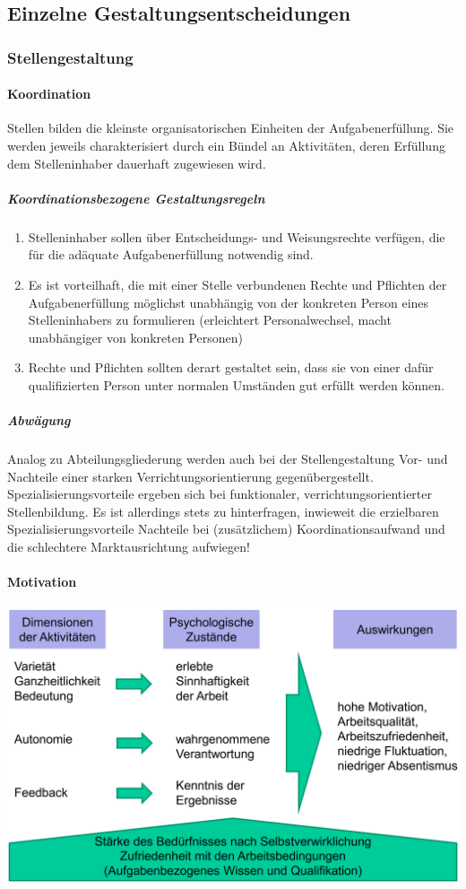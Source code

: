 \subsection{Einzelne Gestaltungsentscheidungen}
\subsubsection{Stellengestaltung}
\paragraph{Koordination}
Stellen bilden die kleinste organisatorischen Einheiten der Aufgabenerfüllung. Sie werden jeweils charakterisiert durch ein Bündel an Aktivitäten, deren Erfüllung dem Stelleninhaber dauerhaft zugewiesen wird.

\subparagraph{Koordinationsbezogene Gestaltungsregeln}
\begin{enumerate}
	\item Stelleninhaber sollen über Entscheidungs- und Weisungsrechte verfügen, die für die adäquate Aufgabenerfüllung notwendig sind.
	\item Es ist vorteilhaft, die mit einer Stelle verbundenen Rechte und Pflichten der Aufgabenerfüllung möglichst unabhängig von der konkreten Person eines Stelleninhabers zu formulieren (erleichtert Personalwechsel, macht unabhängiger von konkreten Personen)
	\item Rechte und Pflichten sollten derart gestaltet sein, dass sie von einer dafür qualifizierten Person unter normalen Umständen gut erfüllt werden können.
\end{enumerate}

\subparagraph{Abwägung}
Analog zu Abteilungsgliederung werden auch bei der Stellengestaltung Vor- und Nachteile einer starken Verrichtungsorientierung gegenübergestellt. Spezialisierungsvorteile ergeben sich bei funktionaler, verrichtungsorientierter Stellenbildung. Es ist allerdings stets zu hinterfragen, inwieweit die erzielbaren Spezialisierungsvorteile Nachteile bei (zusätzlichem) Koordinationsaufwand und die schlechtere Marktausrichtung aufwiegen!

\paragraph{Motivation}
\includegraphics[width=0.5\linewidth]{images/motivation}

